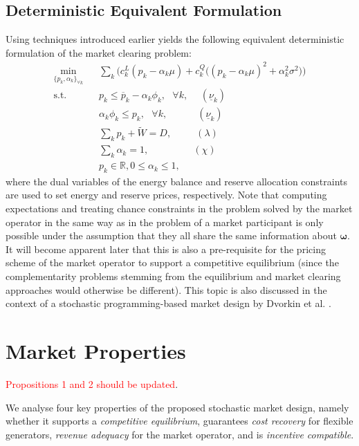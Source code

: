 \documentclass{article}
\begin{document}
\subsection{Deterministic Equivalent Formulation}
Using techniques introduced earlier yields the following equivalent deterministic formulation of the market clearing problem:
\begin{align}
\underset{\{p_k, \alpha_k\}_{\forall k}}{\min} \hspace{10pt} & \sum_k \Big(c_k^L(p_k - \alpha_k \mu) + c_k^Q \big((p_k - \alpha_k \mu)^2 + \alpha_k^2 \sigma^2\big)\Big)\\
\mbox{s.t. } & p_k \le \overline{p}_k - \alpha_k \phi_k, \mbox{ }\forall k, \hspace{15pt}(\underline{\nu}_k)\\
& \alpha_k \phi_k \le p_k, \mbox{ }\forall k, \hspace{37pt}(\underline{\nu}_k)\\
& \sum_k p_k + \tilde{W} = D, \hspace{30pt} (\lambda)\\
& \sum_k \alpha_k = 1,\hspace{55pt} (\chi) \\
& p_k \in \mathbb{R}, 0 \le \alpha_k \le 1,
\end{align}
where the dual variables of the energy balance and reserve allocation constraints are used to set energy and reserve prices, respectively. Note that computing expectations and treating chance constraints in the problem solved by the market operator in the same way as in the problem of a market participant is only possible under the assumption that they all share the same information about $\boldsymbol{\omega}$. It will become apparent later that this is also a pre-requisite for the pricing scheme of the market operator to support a competitive equilibrium (since the complementarity problems stemming from the equilibrium and market clearing approaches would otherwise be different). This topic is also discussed in the context of a stochastic programming-based market design by Dvorkin et al. \cite{DvorkinV2019}.
\section{Market Properties}

\textcolor{red}{Propositions 1 and 2 should be updated}.

We analyse four key properties of the proposed stochastic market design, namely whether it supports a \textit{competitive equilibrium}, guarantees \textit{cost recovery} for flexible generators, \textit{revenue adequacy} for the market operator, and is \textit{incentive compatible}.
\end{document}
